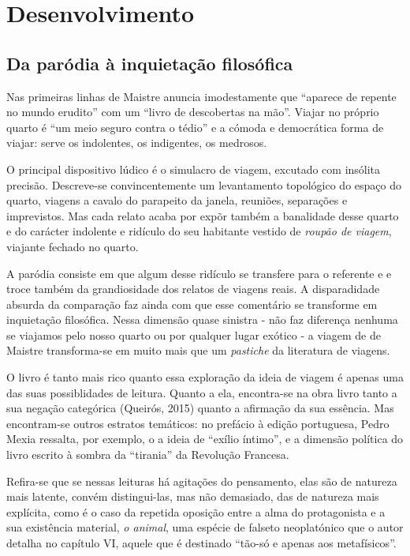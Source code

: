 \documentclass[12pt]{article}
\begin{document}
\section{Desenvolvimento}

\subsection{Da paródia à inquietação filosófica}

Nas primeiras linhas de Maistre anuncia imodestamente que ``aparece de
repente no mundo erudito'' com um ``livro de descobertas na
mão''. Viajar no próprio quarto é ``um meio seguro contra o tédio'' e
a cómoda e democrática forma de viajar: serve os indolentes, os
indigentes, os medrosos.

O principal dispositivo lúdico é o simulacro de viagem, excutado com
insólita precisão. Descreve-se convincentemente um levantamento
topológico do espaço do quarto, viagens a cavalo do parapeito da
janela, reuniões, separações e imprevistos. Mas cada relato acaba por
expõr também a banalidade desse quarto e do carácter indolente e
ridículo do seu habitante vestido de \emph{roupão de viagem}, viajante
fechado no quarto.

A paródia consiste em que algum desse ridículo se transfere para o
referente e e troce também da grandiosidade dos relatos de viagens
reais. A disparadidade absurda da comparação faz ainda com que esse
comentário se transforme em inquietação filosófica. Nessa dimensão
quase sinistra - não faz diferença nenhuma se viajamos pelo nosso
quarto ou por qualquer lugar exótico - a viagem de de Maistre
transforma-se em muito mais que um \emph{pastiche} da literatura de
viagens.

O livro é tanto mais rico quanto essa exploração da ideia de viagem é
apenas uma das suas possiblidades de leitura. Quanto a ela,
encontra-se na obra livro tanto a sua negação categórica (Queirós,
2015) quanto a afirmação da sua essência. Mas encontram-se outros
estratos temáticos: no prefácio à edição portuguesa, Pedro Mexia
ressalta, por exemplo, o a ideia de ``exílio íntimo'', e a dimensão
política do livro escrito à sombra da ``tirania'' da Revolução
Francesa.

Refira-se que se nessas leituras há agitações do pensamento, elas são
de natureza mais latente, convém distingui-las, mas não demasiado, das
de natureza mais explícita, como é o caso da repetida oposição entre a
alma do protagonista e a sua existência material, \emph{o animal}, uma
espécie de falseto neoplatónico que o autor detalha no capítulo VI,
aquele que é destinado ``tão-só e apenas aos metafísicos''.
\end{document}
